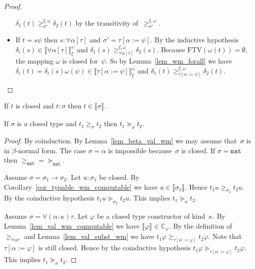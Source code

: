 \documentclass[runningheads,a4paper]{llncs}
\newcommand{\arrtype}{\rightarrow}
\newcommand{\subst}[2]{#1:=#2}
\newcommand{\FTV}{\mathrm{FTV}}
\newcommand{\nat}{\mathtt{nat}}
\newcommand{\Cb}{\mathbb{C}}
\newcommand{\val}[3]{\ensuremath{\llbracket#1\rrbracket_{#2}^{#3}}}
\newcommand{\gteq}[3]{\ensuremath{\ge_{#1}^{#2,#3}}}
\begin{document}
\begin{proof}
\begin{itemize}
    $\delta_1(t)\gteq{\sigma'}{\xi}{\omega}\delta_2(t)$ by the
    transitivity of~$\gteq{\sigma'}{\xi}{\omega}$.
  \item If $t = s \psi$ then $s : \forall\alpha[\tau]$ and $\sigma' =
    \tau[\subst{\alpha}{\psi}]$. By the inductive hypothesis
    $\delta_i(s) \in \val{\forall\alpha[\tau]}{\xi}{\omega}$ and
    $\delta_1(s) \gteq{\forall\alpha[\tau]}{\xi}{\omega}
    \delta_2(s)$. Because $\FTV(\omega(t)) = \emptyset$, the mapping
    $\omega$ is closed for~$\psi$. So by Lemma~\ref{lem_wm_forall} we
    have $\delta_i(t) = \delta_i(s) \omega(\psi) \in
    \val{\tau[\subst{\alpha}{\psi}]}{\xi}{\omega}$ and $\delta_1(t)
    \gteq{\tau[\subst{\alpha}{\psi}]}{\xi}{\omega} \delta_2(t)$.
  \end{itemize}
\end{proof}

\begin{corollary}\label{cor_typable_wm_computable}
  If $t$ is closed and $t : \sigma$ then $t \in \val{\sigma}{}{}$.
\end{corollary}

\begin{lemma}\label{lem_gteq_to_succeq}
  If $\sigma$ is a closed type and $t_1 \geq_\sigma t_2$ then
  $t_1 \succeq_{\sigma} t_2$.
\end{lemma}

\begin{proof}
  By coinduction. By Lemma~\ref{lem_beta_val_wm} we may assume
  that~$\sigma$ is in $\beta$-normal form. The case $\sigma=\alpha$ is
  impossible because~$\sigma$ is closed. If $\sigma = \nat$ then
  ${\geq_\nat} = {\succeq_\nat}$.

  Assume $\sigma=\sigma_1\arrtype\sigma_2$. Let $u : \sigma_1$ be
  closed. By Corollary~\ref{cor_typable_wm_computable} we have $u \in
  \val{\sigma_1}{}{}$. Hence $t_1 u \geq_{\sigma_2} t_2 u$. By the
  coinductive hypothesis $t_1 u \succeq_{\sigma_2} t_2 u$. This
  implies $t_1 \succeq_{\sigma} t_2$.

  Assume $\sigma=\forall(\alpha:\kappa)\tau$. Let $\varphi$ be a
  closed type constructor of kind~$\kappa$. By
  Lemma~\ref{lem_val_wm_computable} we have $\val{\varphi}{}{} \in
  \Cb_\varphi$. By the definition of~$\geq_{\forall\alpha\tau}$ and
  Lemma~\ref{lem_val_subst_wm} we have $t_1 \varphi
  \geq_{\tau[\subst{\alpha}{\varphi}]} t_2 \varphi$. Note that
  $\tau[\subst{\alpha}{\varphi}]$ is still closed. Hence by the
  coinductive hypothesis $t_1 \varphi
  \succeq_{\tau[\subst{\alpha}{\varphi}]} t_2 \varphi$. This implies
  $t_1 \succeq_{\sigma} t_2$.
\end{proof}
\end{document}
